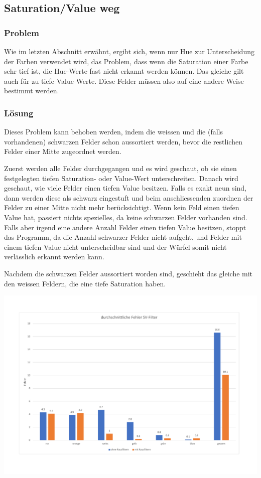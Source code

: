 \documentclass[a4paper, 12pt]{article}
\begin{document}
\subsection{Saturation/Value weg}
\subsubsection{Problem}
Wie im letzten Abschnitt erwähnt, ergibt sich, wenn nur Hue zur Unterscheidung der Farben verwendet wird, das Problem, dass wenn die Saturation einer Farbe sehr tief ist, die Hue-Werte fast nicht erkannt werden können. Das gleiche gilt auch für zu tiefe Value-Werte. Diese Felder müssen also auf eine andere Weise bestimmt werden. 
\subsubsection{Lösung}
Dieses Problem kann behoben werden, indem die weissen und die (falls vorhandenen) schwarzen Felder schon aussortiert werden, bevor die restlichen Felder einer Mitte zugeordnet werden.

Zuerst werden alle Felder durchgegangen und es wird geschaut, ob sie einen festgelegten tiefen Saturation- oder Value-Wert unterschreiten. Danach wird geschaut, wie viele Felder einen tiefen Value besitzen. Falls es exakt neun sind, dann werden diese als schwarz eingestuft und beim anschliessenden zuordnen der Felder zu einer Mitte nicht mehr berücksichtigt. Wenn kein Feld einen tiefen Value hat, passiert nichts spezielles, da keine schwarzen Felder vorhanden sind. Falls aber irgend eine andere Anzahl Felder einen tiefen Value besitzen, stoppt das Programm, da die Anzahl schwarzer Felder nicht aufgeht, und Felder mit einem tiefen Value nicht unterscheidbar sind und der Würfel somit nicht verlässlich erkannt werden kann.

 Nachdem die schwarzen Felder aussortiert worden sind, geschieht das gleiche mit den weissen Feldern, die eine tiefe Saturation haben. 
 
\includegraphics[scale=0.4]{Fehler_SV_Filter} 
\end{document}
